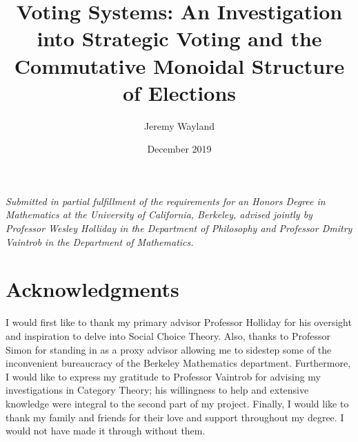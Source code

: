 \documentclass{article}
\title{Voting Systems: An Investigation into Strategic Voting and the Commutative Monoidal Structure of Elections}
\date{December 2019}
\author{Jeremy Wayland}
\begin{document}

\begin{titlepage}
\maketitle 
\begin{center}
    \large{
\textit{Submitted in partial fulfillment of the requirements for an Honors Degree in Mathematics at the University of California, Berkeley, advised jointly by Professor Wesley Holliday in the Department of Philosophy and Professor Dmitry Vaintrob in the Department of Mathematics.}}
\end{center}

\end{titlepage}

\vspace*{\fill}
\section*{Acknowledgments}
I would first like to thank my primary advisor Professor Holliday for his oversight and inspiration to delve into Social Choice Theory. Also, thanks to Professor Simon for standing in as a proxy advisor allowing me to sidestep some of the inconvenient bureaucracy of the Berkeley Mathematics department. Furthermore, I would like to express my gratitude to Professor Vaintrob for advising my investigations in Category Theory; his willingness to help and extensive knowledge were integral to the second part of my project. Finally, I would like to thank my family and friends for their love and support throughout my degree. I would not have made it through without them.
\vspace*{\fill}




\clearpage
\end{document}
